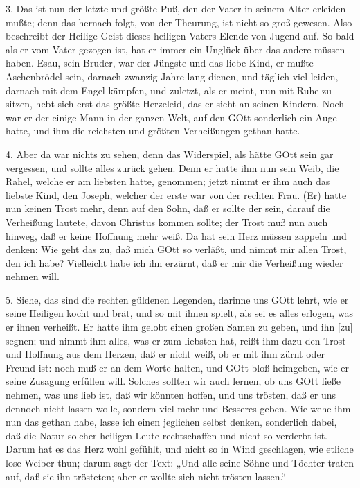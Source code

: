 3. Das ist nun der letzte und größte Puß, den der Vater in seinem Alter erleiden mußte; denn das hernach folgt, von der Theurung, ist nicht so groß gewesen. Also beschreibt der Heilige Geist dieses heiligen Vaters Elende von Jugend auf. So bald als er vom Vater gezogen ist, hat er immer ein Unglück über das andere müssen haben. Esau, sein Bruder, war der Jüngste und das liebe Kind, er mußte Aschenbrödel sein, darnach zwanzig Jahre lang dienen, und täglich viel leiden, darnach mit dem Engel kämpfen, und zuletzt, als er meint, nun mit Ruhe zu sitzen, hebt sich erst das größte Herzeleid, das er sieht an seinen Kindern. Noch war er der einige Mann in der ganzen Welt, auf den GOtt sonderlich ein Auge hatte, und ihm die reichsten und größten Verheißungen gethan hatte.

4. Aber da war nichts zu sehen, denn das Widerspiel, als hätte GOtt sein gar vergessen, und sollte alles zurück gehen. Denn er hatte ihm nun sein Weib, die Rahel, welche er am liebsten hatte, genommen; jetzt nimmt er ihm auch das liebste Kind, den Joseph, welcher der erste war von der rechten Frau. (Er) hatte nun keinen Trost mehr, denn auf den Sohn, daß er sollte der sein, darauf die Verheißung lautete, davon Christus kommen sollte; der Trost muß nun auch hinweg, daß er keine Hoffnung mehr weiß. Da hat sein Herz müssen zappeln und denken: Wie geht das zu, daß mich GOtt so verläßt, und nimmt mir allen Trost, den ich habe? Vielleicht habe ich ihn erzürnt, daß er mir die Verheißung wieder nehmen will.

5. Siehe, das sind die rechten güldenen Legenden, darinne uns GOtt lehrt, wie er seine Heiligen kocht und brät, und so mit ihnen spielt, als sei es alles erlogen, was er ihnen verheißt. Er hatte ihm gelobt einen großen Samen zu geben, und ihn [zu] segnen; und nimmt ihm alles, was er zum liebsten hat, reißt ihm dazu den Trost und Hoffnung aus dem Herzen, daß er nicht weiß, ob er mit ihm zürnt oder Freund ist: noch muß er an dem Worte halten, und GOtt bloß heimgeben, wie er seine Zusagung erfüllen will. Solches sollten wir auch lernen, ob uns GOtt ließe nehmen, was uns lieb ist, daß wir könnten hoffen, und uns trösten, daß er uns dennoch nicht lassen wolle, sondern viel mehr und Besseres geben. Wie wehe ihm nun das gethan habe, lasse ich einen jeglichen selbst denken, sonderlich dabei, daß die Natur solcher heiligen Leute rechtschaffen und nicht so verderbt ist. Darum hat es das Herz wohl gefühlt, und nicht so in Wind geschlagen, wie etliche lose Weiber thun; darum sagt der Text: „Und alle seine Söhne und Töchter traten auf, daß sie ihn trösteten; aber er wollte sich nicht trösten lassen.“

